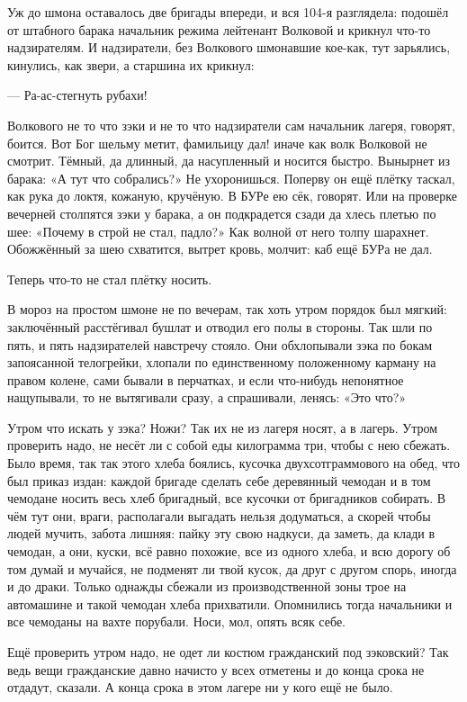 Уж до шмона оставалось две бригады впереди, и вся 104-я разглядела: подошёл от штабного барака
начальник режима лейтенант Волковой и крикнул что-то надзирателям. И надзиратели, без
Волкового шмонавшие кое-как, тут зарьялись, кинулись, как звери, а старшина их крикнул:

--- Ра-ас-стегнуть рубахи!

Волкового не то что зэки и не то что надзиратели \dash сам начальник лагеря, говорят, боится. Вот
Бог шельму метит, фамильицу дал! \dash иначе как волк Волковой не смотрит. Тёмный, да длинный, да
насупленный \dash и носится быстро. Вынырнет из барака: «А тут что собрались?» Не ухоронишься.
Поперву он ещё плётку таскал, как рука до локтя, кожаную, кручёную. В БУРе ею сёк, говорят. Или
на проверке вечерней столпятся зэки у барака, а он подкрадется сзади да хлесь плетью по шее:
«Почему в строй не стал, падло?» Как волной от него толпу шарахнет. Обожжённый за шею
схватится, вытрет кровь, молчит: каб ещё БУРа не дал.

Теперь что-то не стал плётку носить.

В мороз на простом шмоне не по вечерам, так хоть утром порядок был мягкий: заключённый
расстёгивал бушлат и отводил его полы в стороны. Так шли по пять, и пять надзирателей
навстречу стояло. Они обхлопывали зэка по бокам запоясанной телогрейки, хлопали по
единственному положенному карману на правом колене, сами бывали в перчатках, и если
что-нибудь непонятное нащупывали, то не вытягивали сразу, а спрашивали, ленясь: «Это \dash что?»

Утром что искать у зэка? Ножи? Так их не из лагеря носят, а в лагерь. Утром проверить надо, не
несёт ли с собой еды килограмма три, чтобы с нею сбежать. Было время, так так этого хлеба
боялись, кусочка двухсотграммового на обед, что был приказ издан: каждой бригаде сделать
себе деревянный чемодан и в том чемодане носить весь хлеб бригадный, все кусочки от
бригадников собирать. В чём тут они, враги, располагали выгадать \dash нельзя додуматься, а
скорей чтобы людей мучить, забота лишняя: пайку эту свою надкуси, да заметь, да клади в
чемодан, а они, куски, всё равно похожие, все из одного хлеба, и всю дорогу об том думай и
мучайся, не подменят ли твой кусок, да друг с другом спорь, иногда и до драки. Только однажды
сбежали из производственной зоны трое на автомашине и такой чемодан хлеба прихватили.
Опомнились тогда начальники и все чемоданы на вахте порубали. Носи, мол, опять всяк себе.

Ещё проверить утром надо, не одет ли костюм гражданский под зэковский? Так ведь вещи
гражданские давно начисто у всех отметены и до конца срока не отдадут, сказали. А конца срока
в этом лагере ни у кого ещё не было.

